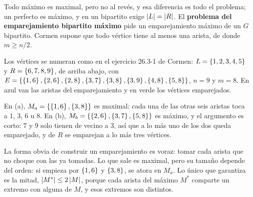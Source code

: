 \documentclass[11pt,letterpaper]{article}
\begin{document}
Todo máximo es maximal, pero no al revés, y esa diferencia es todo
el problema; un perfecto es máximo, y en un bipartito exige
$\left\lvert L \right\rvert = \left\lvert R \right\rvert$. El \textbf{problema del emparejamiento
bipartito máximo} pide un emparejamiento máximo de un $G$ bipartito.
Cormen supone que todo vértice tiene al menos una arista, de donde
$m \ge n/2$.

\begin{ejemplo}
  \label{ej:emparejamiento-cormen}
  Los vértices se numeran como en el ejercicio 26.3-1 de Cormen:
  $L = \left\{ 1, 2, 3, 4, 5 \right\}$ y $R = \left\{ 6, 7, 8, 9 \right\}$, de arriba
  abajo, con $E = \left\{ \left\{ 1,6 \right\}, \left\{ 2,6 \right\}, \left\{ 2,8 \right\}, \left\{ 3,7 \right\},
  \left\{ 3,8 \right\}, \left\{ 3,9 \right\}, \left\{ 4,8 \right\}, \left\{ 5,8 \right\} \right\}$, $n = 9$ y $m = 8$. En
  azul van las aristas del emparejamiento y en verde los vértices
  emparejados.
  \begin{center}
  \end{center}
  En (a), $M_a = \left\{ \left\{ 1,6 \right\}, \left\{ 3,8 \right\} \right\}$ es maximal: cada una de
  las otras seis aristas toca a $1$, $3$, $6$ u $8$. En (b),
  $M_b = \left\{ \left\{ 2,6 \right\}, \left\{ 3,7 \right\}, \left\{ 5,8 \right\} \right\}$ es máximo, y el
  argumento es corto: $7$ y $9$ solo tienen de vecino a $3$, así que
  a lo más uno de los dos queda emparejado, y de $R$ se emparejan a
  lo más tres vértices.
\end{ejemplo}

La forma obvia de construir un emparejamiento es voraz: tomar cada
arista que no choque con las ya tomadas. Lo que sale es maximal, pero
su tamaño depende del orden: si empieza por $\left\{ 1,6 \right\}$ y
$\left\{ 3,8 \right\}$, se atora en $M_a$. Lo único que garantiza es la mitad,
$\left\lvert M^* \right\rvert \le 2\left\lvert M \right\rvert$, porque cada arista del máximo $M^*$ comparte
un extremo con alguna de $M$, y esos extremos son distintos.
\end{document}
